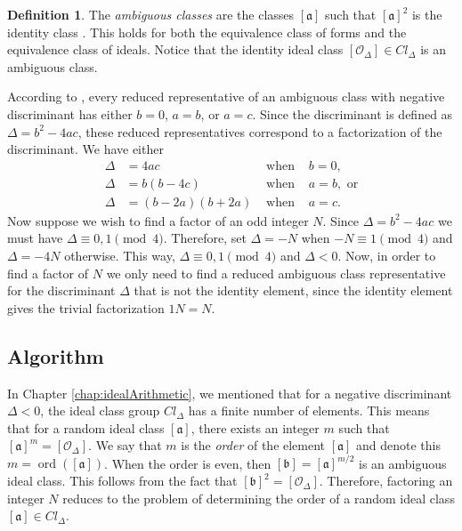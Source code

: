 \documentclass{ucalgthes1}
\theoremstyle{definition}
\newtheorem{defn}[thm]{Definition}
\DeclareMathOperator{\ord}{ord}
\begin{document}
\begin{defn}
The \emph{ambiguous classes} are the classes $[\mathfrak a]$ such that ${[\mathfrak a]}^2$ is the identity class \cite{Schnorr1984}.  This holds for both the equivalence class of forms and the equivalence class of ideals.  Notice that the identity ideal class $[\mathcal O_\Delta] \in Cl_\Delta$ is an ambiguous class.
\end{defn}

According to \cite{Schnorr1984}, every reduced representative of an ambiguous class with negative discriminant has either $b = 0$, $a = b$, or $a = c$.  Since the discriminant is defined as $\Delta = b^2 - 4ac$, these reduced representatives correspond to a factorization of the discriminant.  We have either
\begin{align*}
\Delta &= 4ac & \textrm{ when } & b = 0, \\
\Delta &= b(b - 4c) & \textrm{ when } & a = b, \textrm{ or} \\
\Delta &= (b - 2a)(b + 2a) & \textrm{ when } & a = c.
\end{align*}
Now suppose we wish to find a factor of an odd integer $N$. Since $\Delta = b^2 - 4ac$ we must have $\Delta \equiv 0, 1 \pmod 4$.  Therefore, set $\Delta = -N$ when $-N \equiv 1 \pmod 4$ and $\Delta = -4N$ otherwise.  This way, $\Delta \equiv 0, 1 \pmod 4$ and $\Delta < 0$. Now, in order to find a factor of $N$ we only need to find a reduced ambiguous class representative for the discriminant $\Delta$ that is not the identity element, since the identity element gives the trivial factorization $1N=N$.

\subsection{Algorithm}
\newcommand{\aclass}{[\mathfrak a]}
\newcommand{\bclass}{[\mathfrak b]}
\newcommand{\cclass}{[\mathfrak c]}
\newcommand{\dclass}{[\mathfrak d]}
\newcommand{\idclass}{[\mathcal O_\Delta]}

In Chapter \ref{chap:idealArithmetic}, we mentioned that for a negative discriminant $\Delta < 0$, the ideal class group $Cl_\Delta$ has a finite number of elements.  This means that for a random ideal class $\aclass$, there exists an integer $m$ such that $\aclass^m = \idclass$. We say that $m$ is the \emph{order} of the element $\aclass$ and denote this $m = \ord(\aclass)$.  When the order is even, then $\bclass = \aclass^{m/2}$ is an ambiguous ideal class.  This follows from the fact that $\bclass^2 = \idclass$.  Therefore, factoring an integer $N$ reduces to the problem of determining the order of a random ideal class $\aclass \in Cl_\Delta$.
\end{document}
